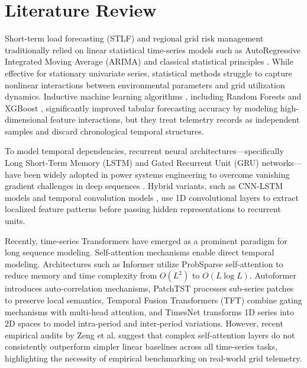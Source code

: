 \section{Literature Review}
Short-term load forecasting (STLF) and regional grid risk management traditionally relied on linear statistical time-series models such as AutoRegressive Integrated Moving Average (ARIMA) and classical statistical principles \cite{hyndman2018forecasting}. While effective for stationary univariate series, statistical methods struggle to capture nonlinear interactions between environmental parameters and grid utilization dynamics. Inductive machine learning algorithms \cite{michalski1983theory}, including Random Forests \cite{breiman2001random} and XGBoost \cite{chen2016xgboost}, significantly improved tabular forecasting accuracy by modeling high-dimensional feature interactions, but they treat telemetry records as independent samples and discard chronological temporal structures.

To model temporal dependencies, recurrent neural architectures—specifically Long Short-Term Memory (LSTM) \cite{hochreiter1997long} and Gated Recurrent Unit (GRU) \cite{cho2014learning, chung2014empirical} networks—have been widely adopted in power systems engineering to overcome vanishing gradient challenges in deep sequences \cite{bengio1994learning}. Hybrid variants, such as CNN-LSTM models \cite{shi2015convolutional} and temporal convolution models \cite{lai2018modeling}, use 1D convolutional layers to extract localized feature patterns before passing hidden representations to recurrent units.

Recently, time-series Transformers have emerged as a prominent paradigm for long sequence modeling. Self-attention mechanisms \cite{vaswani2017attention} enable direct temporal modeling. Architectures such as Informer \cite{zhou2021informer} utilize ProbSparse self-attention to reduce memory and time complexity from $O(L^2)$ to $O(L \log L)$. Autoformer \cite{wu2021autoformer} introduces auto-correlation mechanisms, PatchTST \cite{nie2022time} processes sub-series patches to preserve local semantics, Temporal Fusion Transformers (TFT) \cite{lim2021temporal} combine gating mechanisms with multi-head attention, and TimesNet \cite{wu2023timesnet} transforms 1D series into 2D spaces to model intra-period and inter-period variations. However, recent empirical audits by Zeng et al. \cite{zeng2023transformers} suggest that complex self-attention layers do not consistently outperform simpler linear baselines across all time-series tasks, highlighting the necessity of empirical benchmarking on real-world grid telemetry.

